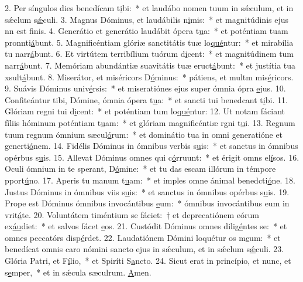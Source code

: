 2. Per síngulos dies benedícam t\uline{i}bi:~* et laudábo nomen tuum in sǽculum, et in sǽclum s\uline{ǽ}culi.
3. Magnus Dóminus, et laudábilis n\uline{i}mis:~* et magnitúdinis ejus nn est f\uline{i}nis.
4. Generátio et generátio laudábit ópera t\uline{u}a:~* et poténtiam tuam pronnti\uline{á}bunt.
5. Magnificéntiam glóriæ sanctitátis tuæ lo\uline{qué}ntur:~* et mirabília tu narr\uline{á}bunt.
6. Et virtútem terribílium tuórum d\uline{i}cent:~* et magnitúdinem tum narr\uline{á}bunt.
7. Memóriam abundántiæ suavitátis tuæ eruct\uline{á}bunt:~* et justítia tua xsult\uline{á}bunt.
8. Miserátor, et miséricors D\uline{ó}minus:~* pátiens, et multm mis\uline{é}ricors.
9. Suávis Dóminus univ\uline{é}rsis:~* et miseratiónes ejus super ómnia ópra \uline{e}jus.
10. Confiteántur tibi, Dómine, ómnia ópera t\uline{u}a:~* et sancti tui benedcant t\uline{i}bi.
11. Glóriam regni tui d\uline{i}cent:~* et poténtiam tum lo\uline{qué}ntur:
12. Ut notam fáciant fíliis hóminum poténtiam t\uline{u}am:~* et glóriam magnificéntiæ rgni t\uline{u}i.
13. Regnum tuum regnum ómnium sæcul\uline{ó}rum:~* et dominátio tua in omni generatióne et generti\uline{ó}nem.
14. Fidélis Dóminus in ómnibus verbis s\uline{u}is:~* et sanctus in ómnibus opérbus s\uline{u}is.
15. Allevat Dóminus omnes qui c\uline{ó}rruunt:~* et érigit omns el\uline{í}sos.
16. Oculi ómnium in te sperant, D\uline{ó}mine:~* et tu das escam illórum in témpore pport\uline{ú}no.
17. Aperis tu manum t\uline{u}am:~* et imples omne ánimal benedcti\uline{ó}ne.
18. Justus Dóminus in ómnibus viis s\uline{u}is:~* et sanctus in ómnibus opérbus s\uline{u}is.
19. Prope est Dóminus ómnibus invocántibus \uline{e}um:~* ómnibus invocántibus eum in vrit\uline{á}te.
20. Voluntátem timéntium se fáciet:~† et deprecatiónem eórum ex\uline{áu}diet:~* et salvos fácet \uline{e}os.
21. Custódit Dóminus omnes dilig\uline{é}ntes se:~* et omnes peccatórs disp\uline{é}rdet.
22. Laudatiónem Dómini loquétur os m\uline{e}um:~* et benedícat omnis caro nómini sancto ejus in sǽculum, et in sǽclum s\uline{ǽ}culi.
23. Glória Patri, et F\uline{í}lio,~* et Spiríti S\uline{a}ncto.
24. Sicut erat in princípio, et nunc, et s\uline{e}mper,~* et in sǽcula sæculrum. \uline{A}men.
